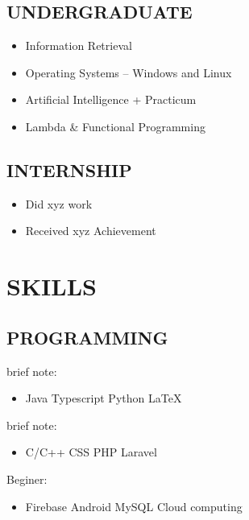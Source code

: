 \documentclass[10pt,letterpaper]{article}
\begin{document}
\begin{multicols*}{2}
\begin{itemize}[leftmargin=*, nosep, itemsep=0pt, parsep=0pt, topsep=0pt, partopsep=0pt]
\end{itemize}

\subsection*{UNDERGRADUATE}
\begin{itemize}[leftmargin=*, nosep, itemsep=0pt, parsep=0pt, topsep=0pt, partopsep=0pt]
    \item Information Retrieval
    \item Operating Systems -- Windows and Linux
    \item Artificial Intelligence + Practicum
    \item Lambda \& Functional Programming

\end{itemize}


\subsection*{INTERNSHIP}
\begin{itemize}[leftmargin=*, nosep, itemsep=0pt, parsep=0pt, topsep=0pt, partopsep=0pt]
    \item Did xyz work
        \item Received xyz Achievement
\end{itemize}



\section*{SKILLS}
\subsection*{PROGRAMMING}
\footnotesize brief note:
\begin{itemize}[leftmargin=*, nosep, itemsep=0pt, parsep=0pt, topsep=0pt, partopsep=0pt]
    \item Java \quad Typescript \quad Python
    \LaTeX
\end{itemize}
\footnotesize brief note:
\begin{itemize}[leftmargin=*, nosep, itemsep=0pt, parsep=0pt, topsep=0pt, partopsep=0pt]
    \item C/C++ \quad CSS \quad PHP \quad Laravel
\end{itemize}
\footnotesize Beginer:
\begin{itemize}[leftmargin=*, nosep, itemsep=0pt, parsep=0pt, topsep=0pt, partopsep=0pt]
    \item Firebase \quad Android \quad MySQL \quad Cloud computing
\end{itemize}


\end{multicols*}
\end{document}
